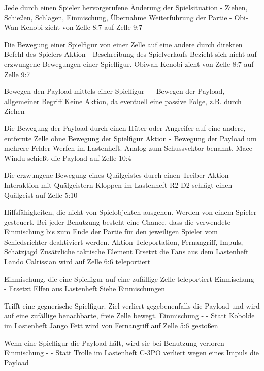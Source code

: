 {Jede durch einen Spieler hervorgerufene Änderung der Spielsituation}
{-}
{Ziehen, Schießen, Schlagen, Einmischung, Übernahme}
{Weiterführung der Partie}
{-}
{Obi-Wan Kenobi zieht von Zelle 8:7 auf Zelle 9:7}

{Die Bewegung einer Spielfigur von einer Zelle auf eine andere durch direkten Befehl des Spielers}
{Aktion}
{-}
{Beschreibung des Spielverlaufs}
{Bezieht sich nicht auf erzwungene Bewegungen einer Spielfigur.}
{Obiwan Kenobi zieht von Zelle 8:7 auf Zelle 9:7}

{Bewegen den Payload mittels einer Spielfigur}
{-}
{-}
{Bewegen der Payload, allgemeiner Begriff}
{Keine Aktion, da eventuell eine passive Folge, z.B. durch Ziehen}
{-}

{Die Bewegung der Payload durch einen Hüter oder Angreifer auf eine andere, entfernte Zelle ohne Bewegung der Spielfigur}
{Aktion}
{-}
{Bewegung der Payload um mehrere Felder}
{\glqq{}Werfen\grqq{}  im Lastenheft. Analog zum Schussvektor benannt.}
{Mace Windu schießt die Payload auf Zelle 10:4}

{Die erzwungene Bewegung eines Quälgeistes durch einen Treiber}
{Aktion}
{-}
{Interaktion mit Quälgeistern}
{\glqq{}Kloppen\grqq{}  im Lastenheft}
{R2-D2 schlägt einen Quälgeist auf Zelle 5:10}

{Hilfsfähigkeiten, die nicht von Spielobjekten ausgehen. Werden von einem Spieler gesteuert. Bei jeder Benutzung besteht eine Chance, dass die verwendete Einmischung bis zum Ende der Partie für den jeweiligen Spieler vom Schiedsrichter deaktiviert werden.}
{Aktion}
{Teleportation, Fernangriff, Impuls, Schatzjagd}
{Zusätzliche taktische Element}
{Ersetzt die \glqq{}Fans\grqq{}  aus dem Lastenheft}
{Lando Calrissian wird auf Zelle 6:6 teleportiert}

{Einmischung, die eine Spielfigur auf eine zufällige Zelle teleportiert}
{Einmischung}
{-}
{-}
{Ersetzt \glqq{}Elfen\grqq{}  aus Lastenheft}
{Siehe \glqq{}Einmischungen\grqq{} }

{Trifft eine gegnerische Spielfigur. Ziel verliert gegebenenfalls die Payload und wird auf eine zufällige benachbarte, freie Zelle bewegt.}
{Einmischung}
{-}
{-}
{Statt \glqq{}Kobolde\grqq{}  im Lastenheft}
{Jango Fett wird von Fernangriff auf Zelle 5:6 gestoßen}

{Wenn eine Spielfigur die Payload hält, wird sie bei Benutzung verloren}
{Einmischung}
{-}
{-}
{Statt \glqq{}Trolle\grqq{}  im Lastenheft}
{C-3PO verliert wegen eines Impuls die Payload}


